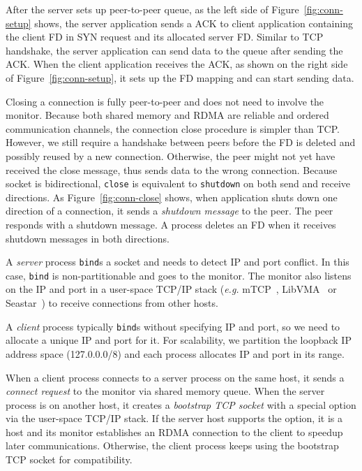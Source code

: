 After the server sets up peer-to-peer queue, as the left side of Figure~\ref{fig:conn-setup} shows, the server application sends a ACK to client application containing the client FD in SYN request and its allocated server FD.
Similar to TCP handshake, the server application can send data to the queue after sending the ACK.
When the client application receives the ACK, as shown on the right side of Figure~\ref{fig:conn-setup}, it sets up the FD mapping and can start sending data.

Closing a connection is fully peer-to-peer and does not need to involve the monitor.
Because both shared memory and RDMA are reliable and ordered communication channels, the connection close procedure is simpler than TCP.
However, we still require a handshake between peers before the FD is deleted and possibly reused by a new connection.
Otherwise, the peer might not yet have received the close message, thus sends data to the wrong connection.
Because socket is bidirectional, \texttt{close} is equivalent to \texttt{shutdown} on both send and receive directions.
As Figure~\ref{fig:conn-close} shows, when application shuts down one direction of a connection, it sends a \emph{shutdown message} to the peer.
The peer responds with a shutdown message.
A process deletes an FD when it receives shutdown messages in both directions.



\iffalse

A \emph{server} process \texttt{bind}s a socket and needs to detect IP and port conflict. In this case, \texttt{bind} is non-partitionable and goes to the monitor. The monitor also listens on the IP and port in a user-space TCP/IP stack (\textit{e.g.} mTCP~\cite{jeong2014mtcp}, LibVMA~\cite{libvma} or Seastar~\cite{seastar}) to receive connections from other hosts.

A \emph{client} process typically \texttt{bind}s without specifying IP and port, so we need to allocate a unique IP and port for it. For scalability, we partition the loopback IP address space (127.0.0.0/8) and each process allocates IP and port in its range.

When a client process connects to a server process on the same host, it sends a \textit{connect request} to the monitor via shared memory queue. When the server process is on another host, it creates a \textit{bootstrap TCP socket} with a special option via the user-space TCP/IP stack. If the server host supports the option, it is a \sys host and its monitor establishes an RDMA connection to the client to speedup later communications. Otherwise, the client process keeps using the bootstrap TCP socket for compatibility.


